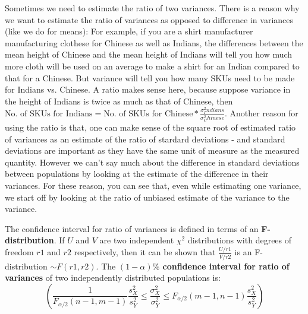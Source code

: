 Sometimes we need to estimate the ratio of two variances. There is a reason why we want to estimate the ratio of variances as opposed to difference in variances (like we do for means): For example, if you are a shirt manufacturer manufacturing clothese for Chinese as well as Indians, the differences between the mean height of Chinese and the mean height of Indians will tell you how much more cloth will be used on an average to make a shirt for an Indian compared to that for a Chinese. But variance will tell you how many SKUs need to be made for Indians vs. Chinese. A ratio makes sense here, because suppose variance in the height of Indians is twice as much as that of Chinese, then \( \text{No. of SKUs for Indians} = \text{No. of SKUs for Chinese} * \frac{\sigma^2_Indians}{\sigma^2_Chinese} \). Another reason for using the ratio is that, one can make sense of the square root of estimated ratio of variances as an estimate of the ratio of stardard deviations - and standard deviations are important as they have the same unit of measure as the measured quantity. However we can't say much about the difference in standard deviations between populations by looking at the estimate of the difference in their variances. For these reason, you can see that, even while estimating one variance, we start off by looking at the ratio of unbiased estimate of the variance to the variance. 

The confidence interval for ratio of variances is defined in terms of an \textbf{F-distribution}. If $U$ and $V$ are two independent $\chi^2$ distributions with degrees of freedom $r1$ and $r2$ respectively, then it can be shown that \( \frac{U/r1}{V/r2} \) is an F-distribution $\sim F(r1, r2)$. The \textbf{\((1-\alpha)\%\) confidence interval for ratio of variances} of two independently distributed populations is:
 	\[ \left(\dfrac{1}{F_{\alpha/2}(n-1,m-1)} \dfrac{s^2_X}{s^2_Y} \leq \dfrac{\sigma^2_X}{\sigma^2_Y}\leq F_{\alpha/2}(m-1,n-1)\dfrac{s^2_X}{s^2_Y}\right) \]

